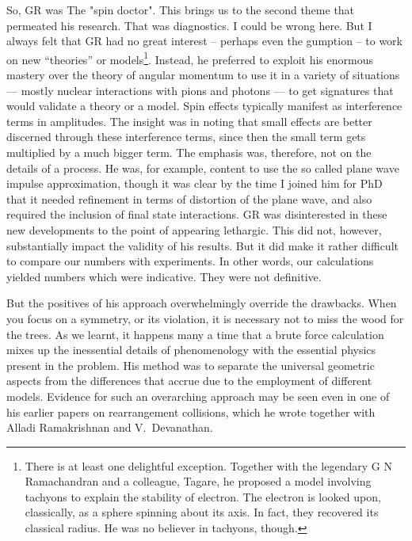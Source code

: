 So, GR was The "spin doctor". This brings us to the second theme that permeated his research. That was diagnostics. I could be wrong here. But I always felt that GR had no great interest -- perhaps even the gumption -- to work on new “theories” or models\footnote{There is at least one delightful exception. Together with the legendary G N Ramachandran and a colleague, Tagare, he proposed a model involving tachyons to explain the stability of electron. The electron is looked upon, classically, as a sphere spinning about its axis. In fact, they recovered its classical radius.  He was no believer in tachyons, though.}. Instead, he preferred to exploit his enormous mastery over the theory of angular momentum to use it in a variety of situations --- mostly nuclear interactions with pions and photons — to get signatures that would validate a theory or a model. Spin effects typically manifest as interference terms in amplitudes. The insight was in noting that small effects are better discerned through these interference terms, since then the small term gets multiplied by a much bigger term.  The emphasis was, therefore, not on the details of a process. He was, for example, content to use the so called plane wave impulse approximation, though it was clear by the time I joined him for PhD that it needed refinement in terms of distortion of the plane wave, and also required the inclusion of final state interactions. GR was disinterested in these new developments to the point of appearing lethargic. This did not, however, substantially impact the validity of his results. But it did make it rather difficult to compare our numbers with experiments. In other words, our calculations yielded numbers which were indicative. They were not definitive.

But the positives of his approach overwhelmingly override the drawbacks. When you focus on a symmetry, or its violation, it is necessary not to miss the wood for the trees. As we learnt, it happens many a time that a brute force calculation mixes up the inessential details of phenomenology with the essential physics present in the problem. His method was to separate the universal geometric aspects from the differences that accrue due to the employment of different models. Evidence for such an overarching approach may be seen even in one of his earlier papers on rearrangement collisions, which he wrote together with Alladi Ramakrishnan and V.\ Devanathan.


